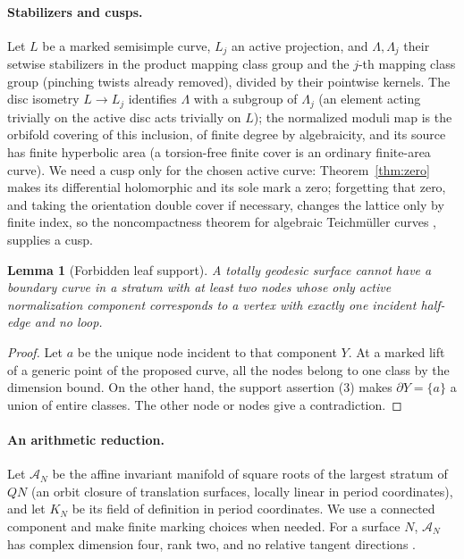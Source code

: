 \documentclass[12pt]{article}
\newtheorem{lemma}[theorem]{Lemma}
\theoremstyle{remark}
\begin{document}
\paragraph{Stabilizers and cusps.}
Let \(L\) be a marked semisimple curve, \(L_j\) an active
projection, and \(\Lambda,\Lambda_j\) their setwise stabilizers in
the product mapping class group and the \(j\)-th mapping class group
(pinching twists already removed), divided by their pointwise
kernels. The disc isometry \(L\to L_j\) identifies \(\Lambda\) with
a subgroup of \(\Lambda_j\) (an element acting trivially on the
active disc acts trivially on \(L\)); the normalized moduli map is
the orbifold covering of this inclusion, of finite degree by
algebraicity, and its source has finite hyperbolic area (a
torsion-free finite cover is an ordinary finite-area curve).
We need a cusp only for the chosen active curve:
Theorem~\ref{thm:zero} makes its differential holomorphic and its
sole mark a zero; forgetting that zero, and taking the orientation
double cover if necessary, changes the lattice only by finite index,
so the noncompactness theorem for algebraic Teichm\"uller curves
\cite{Veech}, \cite[Proposition 2.4]{McMullenSurvey} supplies a cusp.

\begin{lemma}[Forbidden leaf support]\label{lem:forbidden}
A totally geodesic surface cannot have a boundary curve in a stratum
with at least two nodes whose only active normalization component
corresponds to a vertex with exactly one incident half-edge and no
loop.
\end{lemma}

\begin{proof}
Let \(a\) be the unique node incident to that component \(Y\).
At a marked lift of a generic point of the proposed curve, all the
nodes belong to one class by the dimension bound. On the other
hand, the support assertion (3) makes \(\partial Y=\{a\}\) a union of
entire classes. The other node or nodes give a contradiction.
\end{proof}

\paragraph{An arithmetic reduction.}
Let \(\mathcal A_N\) be the affine invariant manifold of square roots
of the largest stratum of \(QN\) (an orbit closure of translation
surfaces, locally linear in period coordinates), and let \(K_N\) be
its field of definition in period coordinates. We use a connected
component and make finite marking choices when needed. For a surface
\(N\), \(\mathcal A_N\) has complex dimension four, rank two, and no
relative tangent directions \cite[Theorem 1.3 and its proof]{WrightTG}.
\end{document}
